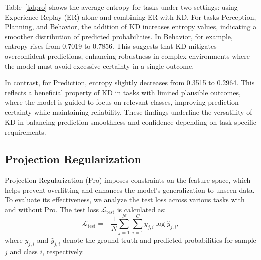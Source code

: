 \begin{table}
\renewcommand{\arraystretch}{1.2}
\caption{Comparison of average entropy and test loss across tasks. The table shows entropy with Experience Replay (ER) alone and ER with Knowledge Distillation (KD), as well as test loss with and without Projection Regularization (Pro).}
\label{kdpro}
\end{table}




Table~\ref{kdpro} shows the average entropy for tasks under two settings: using Experience Replay (ER) alone and combining ER with KD. 
For tasks Perception, Planning, and Behavior, the addition of KD increases entropy values, indicating a smoother distribution of predicted probabilities. In Behavior, for example, entropy rises from 0.7019 to 0.7856. This suggests that KD mitigates overconfident predictions, enhancing robustness in complex environments where the model must avoid excessive certainty in a single outcome.

In contrast, for Prediction, entropy slightly decreases from 0.3515 to 0.2964. This reflects a beneficial property of KD in tasks with limited plausible outcomes, where the model is guided to focus on relevant classes, improving prediction certainty while maintaining reliability. These findings underline the versatility of KD in balancing prediction smoothness and confidence depending on task-specific requirements.

\subsection{Projection Regularization}
Projection Regularization (Pro) imposes constraints on the feature space, which helps prevent overfitting and enhances the model's generalization to unseen data. To evaluate its effectiveness, we analyze the test loss across various tasks with and without Pro. The test loss $\mathcal L_{\text{test}}$ is calculated as:
\begin{equation}
\mathcal L_{\text{test}} = - \frac{1}{N} \sum_{j=1}^N \sum_{i=1}^C y_{j,i} \log \hat{y}_{j,i},
\end{equation}
where $y_{j,i}$ and $\hat{y}_{j,i}$ denote the ground truth and predicted probabilities for sample $j$ and class $i$, respectively.

